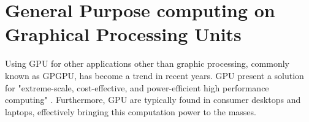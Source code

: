

%



%



%

%



\section{General Purpose computing on Graphical Processing Units}
\label{sec:gpgpu}

Using GPU for other applications other than graphic processing, commonly known as GPGPU, has become a trend in recent years.
GPU present a solution for "extreme-scale, cost-effective, and power-efficient high performance computing" \cite{Chen2012}.
Furthermore, GPU are typically found in consumer desktops and laptops, effectively bringing this computation power to the masses.

